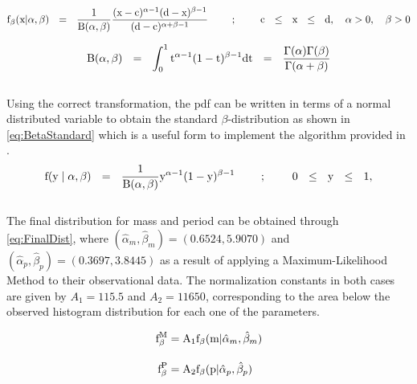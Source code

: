\begingroup
\Large
\begin{equation}
 \textnormal{f}_\beta(\textnormal{x} | \alpha, \beta)~~=~~\frac{1}{\textnormal{B}(\alpha, \beta)}\frac{(\textnormal{x}-\textnormal{c})^{\alpha -1} (\textnormal{d}-\textnormal{x})^{\beta -1}}{(\textnormal{d}-\textnormal{c})^{\alpha + \beta - 1}}~~~~~~~;~~~~~~~\textnormal{c}~~ \leq ~~\textnormal{x} ~~\leq ~~\textnormal{d},~~~\alpha>0,~~~\beta>0
 \label{eq:BetaPDF}
\end{equation}
\endgroup

\begingroup
\Large
\begin{equation}
 \textnormal{B}(\alpha, \beta)~~=~~\int_0^1 \textnormal{t}^{\alpha -1}(1-\textnormal{t})^{\beta -1}\textnormal{dt}~~=~~\frac{\Gamma(\alpha)\Gamma(\beta)}{\Gamma(\alpha + \beta)}
 \label{eq:BetaExplicit}
\end{equation}
\endgroup\\

Using the correct transformation, the pdf can be written in terms of a normal distributed variable to obtain the standard $\beta$-distribution as shown in \autoref{eq:BetaStandard} which is a useful form to implement the algorithm provided in \citeyear{2004CMS...46.397M}.\\   

\begingroup
\Large
\begin{equation}
  \textnormal{f}(\textnormal{y} \mid \alpha, \beta)~~=~~\frac{1}{\textnormal{B}(\alpha, \beta)}\textnormal{y}^{\alpha -1}(1-\textnormal{y})^{\beta-1}~~~~~~~;~~~~~~~\textnormal{0} ~~\leq ~~\textnormal{y} ~~\leq ~~\textnormal{1},
 \label{eq:BetaStandard}
\end{equation}
\endgroup\\

The final distribution for mass and period can be obtained through \autoref{eq:FinalDist}, where $(\hat{\alpha}_m, \hat{\beta}_m) = (0.6524, 5.9070)$ and $(\hat{\alpha}_p, \hat{\beta}_p) = (0.3697, 3.8445)$ as a result of applying a Maximum-Likelihood Method to their observational data. The normalization constants in both cases are given by $A_1 = 115.5$ and $A_2 = 11650$, corresponding to the area below the observed histogram distribution for each one of the parameters. 

\begingroup
\Large
\begin{equation}
  \begin{align*}
    \textnormal{f}_\beta^{\textnormal{M}} & = \textnormal{A}_1\textnormal{f}_\beta(\textnormal{m}|\hat{\alpha}_m, \hat{\beta}_m) \\[10pt]
    \textnormal{f}_\beta^{\textnormal{P}} & = \textnormal{A}_2\textnormal{f}_\beta(\textnormal{p}|\hat{\alpha}_p, \hat{\beta}_p)
    \label{eq:FinalDist}
  \end{align*}
\end{equation}
\endgroup\\

